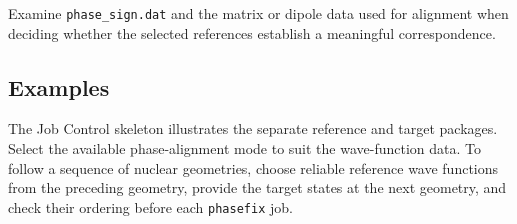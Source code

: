 Examine \texttt{phase\_sign.dat} and the matrix or dipole data used for alignment when deciding whether the selected references establish a meaningful correspondence.

\subsection{Examples}
The Job Control skeleton illustrates the separate reference and target packages. Select the available phase-alignment mode to suit the wave-function data. To follow a sequence of nuclear geometries, choose reliable reference wave functions from the preceding geometry, provide the target states at the next geometry, and check their ordering before each \texttt{phasefix} job.
